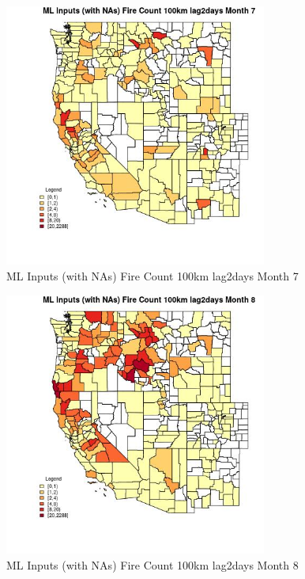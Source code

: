 \begin{figure} 
\centering  
\includegraphics[width=0.77\textwidth]{Code_Outputs/Report_ML_input_PM25_Step4_part_e_de_duplicated_aves_compiled_2019-05-20wNAs_CountyFire_Count_100km_lag2daysmedianMonth7.jpg} 
\caption{\label{fig:Report_ML_input_PM25_Step4_part_e_de_duplicated_aves_compiled_2019-05-20wNAsCountyFire_Count_100km_lag2daysmedianMonth7}ML Inputs (with NAs) Fire Count 100km lag2days Month 7} 
\end{figure} 
 

\begin{figure} 
\centering  
\includegraphics[width=0.77\textwidth]{Code_Outputs/Report_ML_input_PM25_Step4_part_e_de_duplicated_aves_compiled_2019-05-20wNAs_CountyFire_Count_100km_lag2daysmedianMonth8.jpg} 
\caption{\label{fig:Report_ML_input_PM25_Step4_part_e_de_duplicated_aves_compiled_2019-05-20wNAsCountyFire_Count_100km_lag2daysmedianMonth8}ML Inputs (with NAs) Fire Count 100km lag2days Month 8} 
\end{figure} 
 

